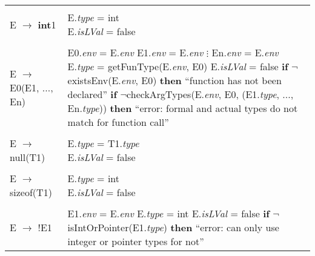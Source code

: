 \documentclass{article}
\begin{document}
\begin{center}
\begin{longtable}{ |l|l| }
     & \\
    
    E $\rightarrow$ \textbf{int}1 & \makecell[l]{E.\textit{type} = int \\ E.\textit{isLVal} = false} \\
    
     & \\
    
    E $\rightarrow$ E0(E1, ..., En) & \makecell[l]{E0.\textit{env} = E.\textit{env} \\ E1.\textit{env} = E.\textit{env} \\ $\vdots$ \\ En.\textit{env} = E.\textit{env} \\ E.\textit{type} = getFunType(E.\textit{env}, E0) \\ E.\textit{isLVal} = false \\ \textbf{if} $\neg$existsEnv(E.\textit{env}, E0) \\ \textbf{then} ``function has not been declared'' \\ \textbf{if} $\neg$checkArgTypes(E.\textit{env}, E0, (E1.\textit{type}, ..., En.\textit{type})) \\ \textbf{then} ``error: formal and actual types do not match for \\ function call''} \\
    
     & \\
    
    E $\rightarrow$ null(T1) & \makecell[l]{E.\textit{type} = T1.\textit{type} \\ E.\textit{isLVal} = false} \\
    
     & \\
    
    E $\rightarrow$ sizeof(T1) & \makecell[l]{E.\textit{type} = int \\ E.\textit{isLVal} = false} \\
    
     & \\
    
    E $\rightarrow$ !E1 & \makecell[l]{E1.\textit{env} = E.\textit{env} \\ E.\textit{type} = int \\ E.\textit{isLVal} = false \\ \textbf{if} $\neg$isIntOrPointer(E1.\textit{type}) \textbf{then} ``error: can only use \\ integer or pointer types for not''} \\
    

\end{longtable}
\end{center}
\end{document}
